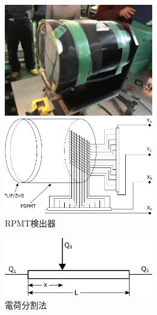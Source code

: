 \begin{figure}[h]
\begin{minipage}{0.5\hsize}
\begin{center}
\includegraphics[width=6.5cm]{detector/detector_photo2.jpg}
\end{center}
\end{minipage}
\begin{minipage}{0.5\hsize}
\begin{center}
\includegraphics[width=6.5cm]{detector/detector_fig2.pdf}
\end{center}
\end{minipage}
\caption{RPMT検出器}
\end{figure}
\begin{figure}[h]
\begin{minipage}{0.5\hsize}
\begin{center}
\includegraphics[width=6.5cm]{detector/detector_fig3.pdf}
\caption{電荷分割法}
\end{center}
\end{minipage}
\end{figure}





